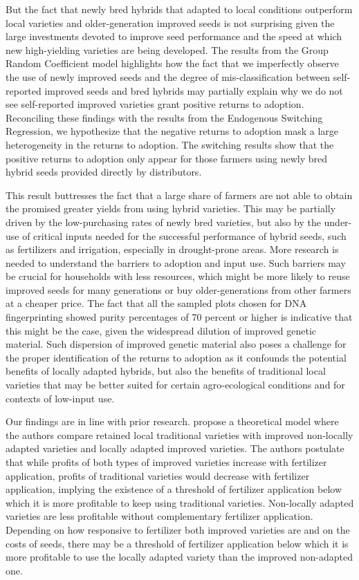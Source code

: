 \documentclass[11pt]{article}
\begin{document}
But the fact that newly bred hybrids that adapted to local conditions outperform local varieties and older-generation improved seeds is not surprising given the large investments devoted to improve seed performance and the speed at which new high-yielding varieties are being developed. The results from the Group Random Coefficient model highlights how the fact that we imperfectly observe the use of newly improved seeds and the degree of mis-classification between self-reported improved seeds and bred hybrids may partially explain why we do not see self-reported improved varieties grant positive returns to adoption. Reconciling these findings with the results from the Endogenous Switching Regression, we hypothesize that the negative returns to adoption mask a large heterogeneity in the returns to adoption. The switching results show that the positive returns to adoption only appear for those farmers using newly bred hybrid seeds provided directly by distributors. 

This result buttresses the fact that a large share of farmers are not able to obtain the promised greater yields from using hybrid varieties. This may be partially driven by the low-purchasing rates of newly bred varieties, but also by the under-use of critical inputs needed for the successful performance of hybrid seeds, such as fertilizers and irrigation, especially in drought-prone areas. More research is needed to understand the barriers to adoption and input use. Such barriers may be crucial for households with less resources, which might be more likely to reuse improved seeds for many generations or buy older-generations from other farmers at a cheaper price. The fact that all the sampled plots chosen for DNA fingerprinting showed purity percentages of 70 percent or higher is indicative that this might be the case, given the widespread dilution of improved genetic material. Such dispersion of improved genetic material also poses a challenge for the proper identification of the returns to adoption as it confounds the potential benefits of locally adapted hybrids, but also the benefits of traditional local varieties that may be better suited for certain agro-ecological conditions and for contexts of low-input use.  

Our findings are in line with prior research. \cite{Bird2020-nt} propose a theoretical model where the authors compare retained local traditional varieties with improved non-locally adapted varieties and locally adapted improved varieties. The authors postulate that while profits of both types of improved varieties increase with fertilizer application, profits of traditional varieties would decrease with fertilizer application, implying the existence of a threshold of fertilizer application below which it is more profitable to keep using traditional varieties. Non-locally adapted varieties are less profitable without complementary fertilizer application. Depending on how responsive to fertilizer both improved varieties are and on the costs of seeds, there may be a threshold of fertilizer application below which it is more profitable to use the locally adapted variety than the improved non-adapted one. \par
\end{document}
